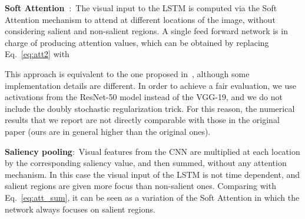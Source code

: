 \textbf{Soft Attention~\cite{icml2015xuc15}}:~The visual input to the LSTM is computed via the Soft Attention mechanism to attend at different locations of the image, without considering salient and non-salient regions. A single feed forward network is in charge of producing attention values, which can be obtained by replacing Eq.~\ref{eq:att2} with

This approach is equivalent to the one proposed in~\cite{icml2015xuc15}, although some implementation details are different. In order to achieve a fair evaluation, we use activations from the ResNet-50 model instead of the VGG-19, and we do not include the doubly stochastic regularization trick. For this reason, the numerical results that we report are not directly comparable with those in the original paper (ours are in general higher than the original ones).

\textbf{Saliency pooling}:~Visual features from the CNN are multiplied at each location by the corresponding saliency value, and then summed, without any attention mechanism. In this case the visual input of the LSTM is not time dependent, and salient regions are given more focus than non-salient ones. Comparing with Eq.~\ref{eq:att_sum}, it can be seen as a variation of the Soft Attention in which the network always focuses on salient regions.


